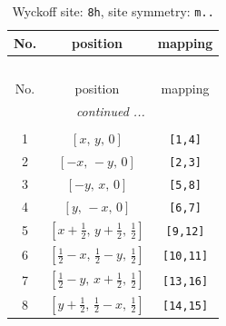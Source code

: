 \documentclass[fleqn,8pt]{jsarticle}
\begin{document}
\begin{longtable}{ccc}
\caption{Wyckoff site: {\tt 8h}, site symmetry: {\tt m..}}
 \\
 \hline \hline
No. & position & mapping \\ \hline \endfirsthead

\multicolumn{2}{l}{\tablename\ \thetable{}} \\
 \hline \hline
No. & position & mapping \\ \hline \endhead

 \hline \hline
\multicolumn{2}{r}{\footnotesize\it continued ...} \\ \endfoot

 \hline \hline
\multicolumn{2}{r}{} \\ \endlastfoot

1 & $\left[ x,\, y,\, 0 \right]$ & {\tt [1,4]} \\ \hline
2 & $\left[ - x,\, - y,\, 0 \right]$ & {\tt [2,3]} \\ \hline
3 & $\left[ - y,\, x,\, 0 \right]$ & {\tt [5,8]} \\ \hline
4 & $\left[ y,\, - x,\, 0 \right]$ & {\tt [6,7]} \\ \hline
5 & $\left[ x + \frac{1}{2},\, y + \frac{1}{2},\, \frac{1}{2} \right]$ & {\tt [9,12]} \\ \hline
6 & $\left[ \frac{1}{2} - x,\, \frac{1}{2} - y,\, \frac{1}{2} \right]$ & {\tt [10,11]} \\ \hline
7 & $\left[ \frac{1}{2} - y,\, x + \frac{1}{2},\, \frac{1}{2} \right]$ & {\tt [13,16]} \\ \hline
8 & $\left[ y + \frac{1}{2},\, \frac{1}{2} - x,\, \frac{1}{2} \right]$ & {\tt [14,15]} \\
\end{longtable}
\renewcommand{\arraystretch}{1.2}
\end{document}
